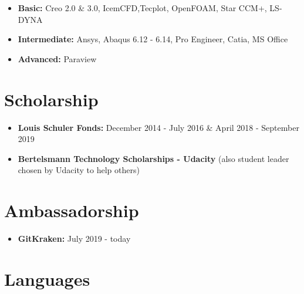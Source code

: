 \documentclass[11pt,a4paper,sans]{moderncv}        %
\begin{document}
\vspace{3pt}

\begin{itemize}

\setlength\itemsep{1em}

\item \textbf{Basic:} Creo 2.0 \& 3.0, IcemCFD,Tecplot, OpenFOAM, Star CCM+, LS-DYNA

\item \textbf{Intermediate:} Ansys, Abaqus 6.12 - 6.14, Pro Engineer, Catia, MS Office

\item \textbf{Advanced:} Paraview

\end{itemize}

\vspace{6pt}

\section{Scholarship}

\begin{itemize}
	
	\setlength\itemsep{1em}
	
	\item \textbf{Louis Schuler Fonds:}  December 2014 - July 2016 \& April 2018 - September 2019
	
	\item \textbf{Bertelsmann Technology Scholarships - Udacity}  (also student leader chosen by Udacity to help others)
	
\end{itemize}

\section{Ambassadorship}

\begin{itemize}

\setlength\itemsep{1em}

\item \textbf{GitKraken:}  July 2019 - today

\end{itemize}

\section{Languages}
\end{document}
